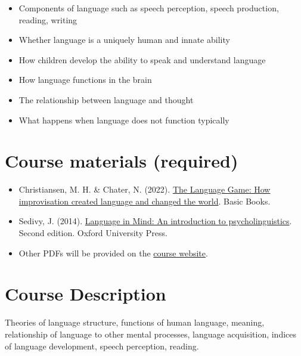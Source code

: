 \documentclass[
  letterpaper,
  DIV=11,
  numbers=noendperiod]{scrreprt}
\providecommand{\tightlist}{%
  \setlength{\itemsep}{0pt}\setlength{\parskip}{0pt}}\usepackage{longtable,booktabs,array}
\begin{document}
\begin{itemize}
\tightlist
\item
  Components of language such as speech perception, speech production,
  reading, writing
\item
  Whether language is a uniquely human and innate ability
\item
  How children develop the ability to speak and understand language
\item
  How language functions in the brain
\item
  The relationship between language and thought
\item
  What happens when language does not function typically
\end{itemize}

\hypertarget{course-materials-required}{%
\section*{Course materials (required)}\label{course-materials-required}}


\begin{itemize}
\tightlist
\item
  Christiansen, M. H. \& Chater, N. (2022).
  \href{https://bookshop.org/p/books/the-language-game-how-improvisation-created-language-and-changed-the-world-nick-chater/16984145?ean=9781541674981}{The
  Language Game: How improvisation created language and changed the
  world}. Basic Books.
\item
  Sedivy, J. (2014).
  \href{https://www.amazon.com/Language-Mind-Psycholinguistics-Julie-Sedivy/dp/1605357057}{Language
  in Mind: An introduction to psycholinguistics}. Second edition. Oxford
  University Press.
\item
  Other PDFs will be provided on the
  \href{https://my.unh.edu/canvas}{course website}.
\end{itemize}

\hypertarget{course-description}{%
\section*{Course Description}\label{course-description}}


Theories of language structure, functions of human language, meaning,
relationship of language to other mental processes, language
acquisition, indices of language development, speech perception,
reading.
\end{document}
